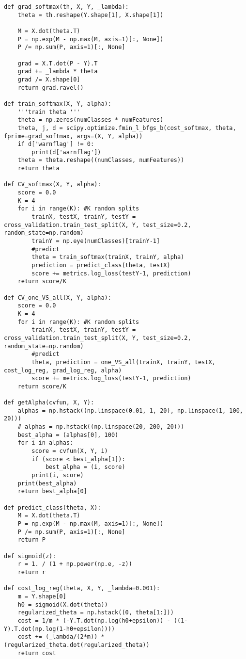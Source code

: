 \documentclass[a4paper,11pt]{article}
\begin{document}
\begin{lstlisting}
def grad_softmax(th, X, Y, _lambda):
    theta = th.reshape(Y.shape[1], X.shape[1])

    M = X.dot(theta.T)
    P = np.exp(M - np.max(M, axis=1)[:, None])
    P /= np.sum(P, axis=1)[:, None]

    grad = X.T.dot(P - Y).T
    grad += _lambda * theta
    grad /= X.shape[0]
    return grad.ravel()

def train_softmax(X, Y, alpha):
    '''train theta '''
    theta = np.zeros(numClasses * numFeatures)
    theta, j, d = scipy.optimize.fmin_l_bfgs_b(cost_softmax, theta, fprime=grad_softmax, args=(X, Y, alpha))
    if d['warnflag'] != 0:
        print(d['warnflag'])
    theta = theta.reshape((numClasses, numFeatures))
    return theta

def CV_softmax(X, Y, alpha):
    score = 0.0
    K = 4
    for i in range(K): #K random splits
        trainX, testX, trainY, testY = cross_validation.train_test_split(X, Y, test_size=0.2, random_state=np.random)
        trainY = np.eye(numClasses)[trainY-1]
        #predict
        theta = train_softmax(trainX, trainY, alpha)
        prediction = predict_class(theta, testX)
        score += metrics.log_loss(testY-1, prediction)
    return score/K

def CV_one_VS_all(X, Y, alpha):
    score = 0.0
    K = 4
    for i in range(K): #K random splits
        trainX, testX, trainY, testY = cross_validation.train_test_split(X, Y, test_size=0.2, random_state=np.random)
        #predict
        theta, prediction = one_VS_all(trainX, trainY, testX, cost_log_reg, grad_log_reg, alpha)
        score += metrics.log_loss(testY-1, prediction)
    return score/K

def getAlpha(cvfun, X, Y):
    alphas = np.hstack((np.linspace(0.01, 1, 20), np.linspace(1, 100, 20)))
    # alphas = np.hstack((np.linspace(20, 200, 20)))
    best_alpha = (alphas[0], 100)
    for i in alphas:
        score = cvfun(X, Y, i)
        if (score < best_alpha[1]):
            best_alpha = (i, score)
        print(i, score)
    print(best_alpha)
    return best_alpha[0]

def predict_class(theta, X):
    M = X.dot(theta.T)
    P = np.exp(M - np.max(M, axis=1)[:, None])
    P /= np.sum(P, axis=1)[:, None]
    return P

def sigmoid(z):
    r = 1. / (1 + np.power(np.e, -z))
    return r

def cost_log_reg(theta, X, Y, _lambda=0.001):
    m = Y.shape[0]
    h0 = sigmoid(X.dot(theta))
    regularized_theta = np.hstack((0, theta[1:]))
    cost = 1/m * (-Y.T.dot(np.log(h0+epsilon)) - ((1-Y).T.dot(np.log(1-h0+epsilon))))
    cost += (_lambda/(2*m)) * (regularized_theta.dot(regularized_theta))
    return cost


\end{lstlisting}
\end{document}
